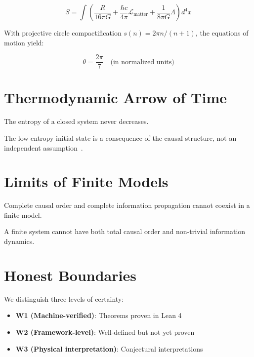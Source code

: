 \documentclass[aps,prd,twocolumn,nofootinbib,floatfix]{revtex4-2}
\begin{document}
\[
S = \int \left( \frac{R}{16\pi G} + \frac{\hbar c}{4\pi} \mathcal{L}_\text{matter} + \frac{1}{8\pi G} \Lambda \right) d^4x
\]

With projective circle compactification $s(n) = 2\pi n/(n+1)$, the equations of motion yield:

\[
\theta = \frac{2\pi}{7} \quad \text{(in normalized units)}
\]

\section{Thermodynamic Arrow of Time}

\begin{theorem}
The entropy of a closed system never decreases.
\end{theorem}

\begin{theorem}
The low-entropy initial state is a consequence of the causal structure, not an independent assumption~\cite{Penrose2004}.
\end{theorem}

\section{Limits of Finite Models}

\begin{theorem}
Complete causal order and complete information propagation cannot coexist in a finite model.
\end{theorem}

\begin{theorem}
A finite system cannot have both total causal order and non-trivial information dynamics.
\end{theorem}

\section{Honest Boundaries}

We distinguish three levels of certainty:

\begin{itemize}
    \item \textbf{W1 (Machine-verified)}: Theorems proven in Lean 4
    \item \textbf{W2 (Framework-level)}: Well-defined but not yet proven
    \item \textbf{W3 (Physical interpretation)}: Conjectural interpretations
\end{itemize}
\end{document}
